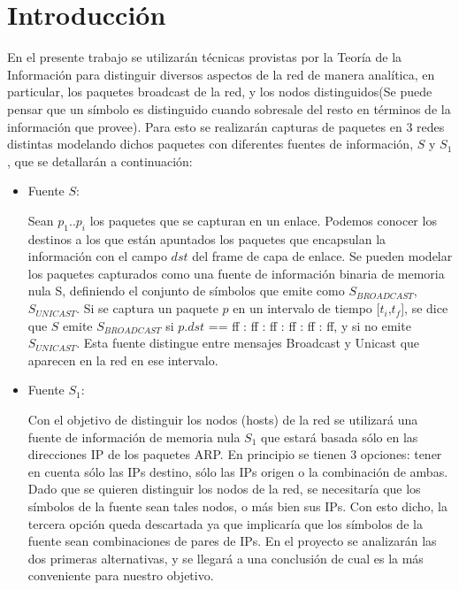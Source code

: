 \section{Introducción}
En el presente trabajo se utilizarán técnicas provistas por la Teoría de la Información para distinguir diversos aspectos de la red de manera analítica, en particular, los paquetes broadcast de la red, y los nodos distinguidos(Se puede pensar que un símbolo es distinguido cuando sobresale del resto en
términos de la información que provee). Para esto se realizarán capturas de paquetes en 3 redes distintas modelando dichos paquetes con diferentes fuentes de información, $S$ y $S_1$, que se detallarán a continuación:

\begin{itemize}


	\item Fuente $S$:
 
Sean $p_1..p_i$ los paquetes que se capturan en un enlace. Podemos conocer los destinos a los que están apuntados los paquetes que encapsulan la información con el campo $dst$ del frame de capa de enlace. Se pueden modelar los paquetes capturados como una fuente de información binaria de memoria nula S, definiendo el conjunto de símbolos que emite como {$S_{BROADCAST}$, $S_{UNICAST}$}. Si se captura un paquete $p$ en un intervalo de tiempo [$t_i$,$t_f$], se dice que $S$ emite $S_{BROADCAST}$ si $p.dst$ == ff : ff : ff : ff : ff : ff, y si no emite $S_{UNICAST}$. Esta fuente distingue entre mensajes Broadcast y Unicast que aparecen en la red en ese intervalo.
 
	\item Fuente $S_1$:
	
Con el objetivo de distinguir los nodos (hosts) de la red se utilizará una fuente de información de memoria nula $S_1$ que estará basada sólo en las direcciones IP de los paquetes ARP. En principio se tienen 3 opciones: tener en cuenta sólo las IPs destino, sólo las IPs origen o la combinación de ambas. Dado que se quieren distinguir los nodos de la red, se necesitaría que los símbolos de la fuente sean tales nodos, o más bien sus IPs. Con esto dicho, la tercera opción queda descartada ya que implicaría que los símbolos de la fuente sean combinaciones de pares de IPs. En el proyecto se analizarán las dos primeras alternativas, y se llegará a una conclusión de cual es la más conveniente para nuestro objetivo.


\end{itemize}